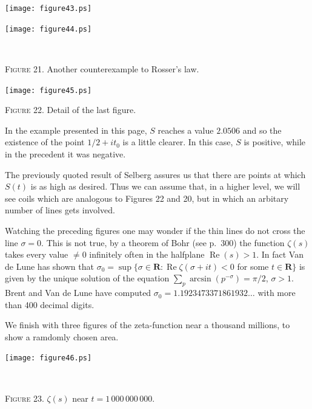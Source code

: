 \documentclass[a4paper]{amsart}
\numberwithin{equation}{section}
\def\Re{\operatorname{\text{Re}}}
\def\R{{\mathbf R}}
\begin{document}
\begin{minipage}{330pt} 
\begin{minipage}{154.5pt}
\texttt{[image: figure43.ps]}
\end{minipage}
\hfil
\begin{minipage}{154.5pt}
\texttt{[image: figure44.ps]}
\end{minipage}
\centerline{\ }
\centerline{ {\scshape Figure} 21. Another counterexample to  Rosser's law.}
\end{minipage}



\vfil\eject

\begin{minipage}{321pt}
\bigskip
\texttt{[image: figure45.ps]}
\vfil
\centerline{{ \scshape Figure} 22. Detail of the last figure.}
\end{minipage}
\begin{large}
\vskip0.2cm
In the example presented in this page, $S$ reaches a value $2.0506$ and so the
existence of the point $1/2 + it_0$ is a little clearer. In this case, $S$ is
positive, while in the precedent it was negative.

The previously quoted result of Selberg assures us that there are points at
which $S(t)$ is as high as desired. Thus we can assume that, in a higher level,
we will see coils which are analogous to Figures 22 and 20, but in
which an arbitary number of lines gets involved.

Watching the preceding figures one may wonder if the thin lines 
do not cross the line $\sigma=0$. This is not true, by a theorem of Bohr (see 
\cite{Ti} p.~300) 
the function $\zeta(s)$ takes every value $\ne 0$ infinitely often in the 
halfplane 
$\Re(s)>1$. In fact Van de Lune \cite{Lu} has shown that 
$\sigma_0=\sup\{\sigma\in\R: \Re\zeta(\sigma+it)<0$ for some $t\in\R\}$ is given by 
the unique solution of the equation $\sum_p \arcsin(p^{-\sigma})=\pi/2$, $\sigma>1$. 
Brent and Van de Lune have computed 
$\sigma_0=1.1923473371861932\dots$ with more than 400 decimal digits. 
\par
We finish with three figures of the zeta-function near a thousand millions, 
to show a ramdomly chosen area.
\goodbreak

\end{large}

\begin{minipage}{335.7426pt}
\hskip-24.2574pt\texttt{[image: figure46.ps]} 
\end{minipage}
\centerline{\ }
\vfil
\centerline{{ \scshape Figure} 23. $\zeta(s)$ near $t=1\,000\,000\,000$.}
\vfil\eject
\end{document}
